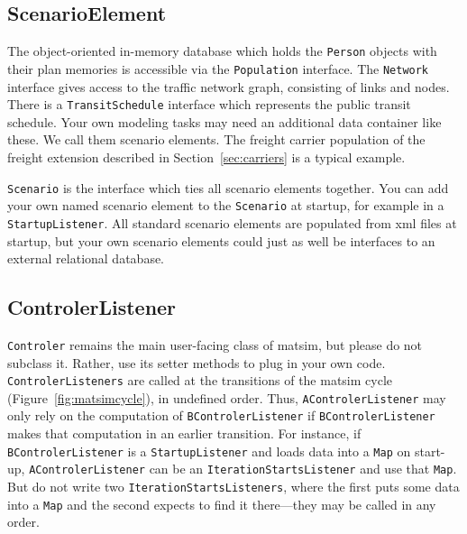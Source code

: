 \subsection{ScenarioElement}
The object-oriented in-memory database which holds the \lstinline|Person| objects with their plan memories is accessible via the
\lstinline|Population| interface. The \lstinline|Network| interface gives access to the traffic network graph, consisting of links and nodes.
There is a \lstinline|TransitSchedule| interface which represents the public transit schedule. Your own modeling tasks may need an additional data container
like these. We call them scenario elements. The freight carrier population of the freight \gls{extension} described in Section~\ref{sec:carriers} is a typical example. 

\lstinline|Scenario| is the interface which ties all scenario elements together. You can add your own named scenario element
to the \lstinline|Scenario| at startup, for example in a \lstinline|StartupListener|. All standard scenario elements are populated
from \gls{xml} files at startup, but your own scenario elements could just as well be interfaces to an external relational database.

\subsection{ControlerListener}
\label{sec:controlerListener-extension-point}
\label{sec:controlerextension}
\lstinline|Controler| remains the main user-facing class of \gls{matsim}, but please do not subclass it. Rather, use its setter methods to plug in your own code.
\lstinline|ControlerListeners| are called at the transitions of the \gls{matsim} cycle (Figure~\ref{fig:matsimcycle}), in undefined order.
Thus, \lstinline|AControlerListener| may only rely on the computation of \lstinline|BControlerListener| if \lstinline|BControlerListener|
 makes that computation in an earlier transition. For instance, if \lstinline|BControlerListener| is a \lstinline|StartupListener|
 and loads data into a \lstinline|Map| on start-up, \lstinline|AControlerListener| can be an \lstinline|IterationStartsListener| and use that \lstinline|Map|.
 But do not write two \lstinline|IterationStartsListeners|, where the first puts some data into a \lstinline|Map| and the second expects to find it there---they may be called in any order.

